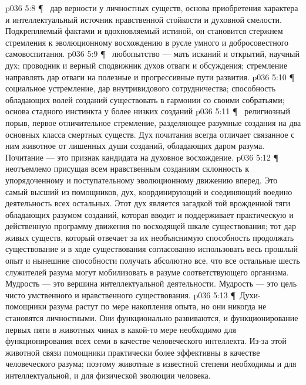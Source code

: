 \vs p036 5:8 \P\ \bibnobreakspace {} дар верности у личностных существ, основа приобретения характера и интеллектуальный источник нравственной стойкости и духовной смелости. Подкрепляемый фактами и вдохновляемый истиной, он становится стержнем стремления к эволюционному восхождению в русле умного и добросовестного самовоспитания.
\vs p036 5:9 \P\ \bibnobreakspace {} любопытство --- мать исканий и открытий, научный дух; проводник и верный сподвижник духов отваги и обсуждения; стремление направлять дар отваги на полезные и прогрессивные пути развития.
\vs p036 5:10 \P\ \bibnobreakspace {} социальное устремление, дар внутривидового сотрудничества; способность обладающих волей созданий существовать в гармонии со своими собратьями; основа стадного инстинкта у более низких созданий
\vs p036 5:11 \P\ \bibnobreakspace {} религиозный порыв, первое отличительное стремление, разделяющее разумные создания на два основных класса смертных существ. Дух почитания всегда отличает связанное с ним животное от лишенных души созданий, обладающих даром разума. Почитание --- это признак кандидата на духовное восхождение.
\vs p036 5:12 \P\ \bibnobreakspace {} неотъемлемо присущая всем нравственным созданиям склонность к упорядоченному и поступательному эволюционному движению вперед. Это самый высший из помощников, дух, координирующий и соединяющий воедино деятельность всех остальных. Этот дух является загадкой той врожденной тяги обладающих разумом созданий, которая вводит и поддерживает практическую и действенную программу движения по восходящей шкале существования; тот дар живых существ, который отвечает за их необъяснимую способность продолжать существование и в ходе существования согласованно использовать весь прошлый опыт и нынешние способности получать абсолютно все, что все остальные шесть служителей разума могут мобилизовать в разуме соответствующего организма. Мудрость --- это вершина интеллектуальной деятельности. Мудрость --- это цель чисто умственного и нравственного существования.
\vs p036 5:13 \P\ Духи\hyp{}помощники разума растут по мере накопления опыта, но они никогда не становятся личностными. Они функционально развиваются, и функционирование первых пяти в животных чинах в какой\hyp{}то мере необходимо для функционирования всех семи в качестве человеческого интеллекта. Из\hyp{}за этой животной связи помощники практически более эффективны в качестве человеческого разума; поэтому животные в известной степени необходимы и для интеллектуальной, и для физической эволюции человека.

